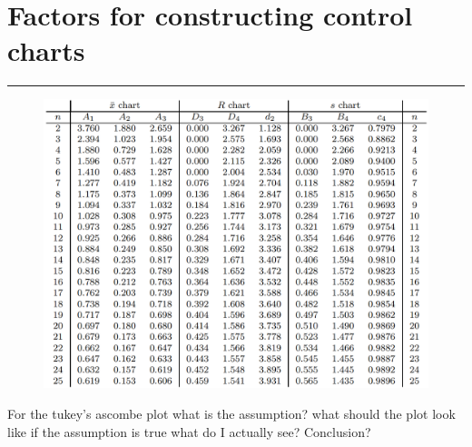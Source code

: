 \section{Factors for constructing control charts}
\noindent\rule[\linienAbstand]{\linewidth}{\linienDickeDick}
\begin{figure}[H]
  \centering
  \includegraphics[width=\linewidth]{Pics/T.15.png}
\end{figure}

For the tukey's ascombe plot
what is the assumption?
what should the plot look like if the assumption is true
what do I actually see?
Conclusion?
